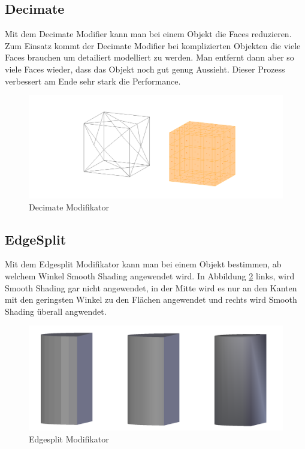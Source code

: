 \subsection{Decimate}
Mit dem Decimate Modifier \citep{blender:decimate_modifier} kann man bei einem Objekt die Faces reduzieren. Zum Einsatz kommt der
Decimate Modifier bei komplizierten Objekten die viele Faces brauchen um detailiert modelliert zu werden. Man entfernt dann aber so viele Faces wieder, dass das Objekt
noch gut genug Aussieht. Dieser Prozess verbessert am Ende sehr stark die Performance.
\begin{figure}[h]
    \centering
    \includegraphics[width=.8\textwidth]{images/Modifikatoren-Decimate.png}
    \caption{Decimate Modifikator}
    \label{modifikatoren:image6}
\end{figure}

\subsection{EdgeSplit}
Mit dem Edgesplit Modifikator kann man \citep{blender:edgesplit_modifier} bei einem Objekt bestimmen, ab welchem Winkel Smooth Shading angewendet wird.
In Abbildung \ref{modifikatoren:image7} links, wird Smooth Shading gar nicht angewendet, in der Mitte wird es nur an den Kanten mit den geringsten Winkel zu den Flächen
angewendet und rechts wird Smooth Shading überall angwendet.
\begin{figure}[h]
    \centering
    \includegraphics[width=.8\textwidth]{images/Modifikatoren-Edgesplit.png}
    \caption{Edgesplit Modifikator}
    \label{modifikatoren:image7}
\end{figure}